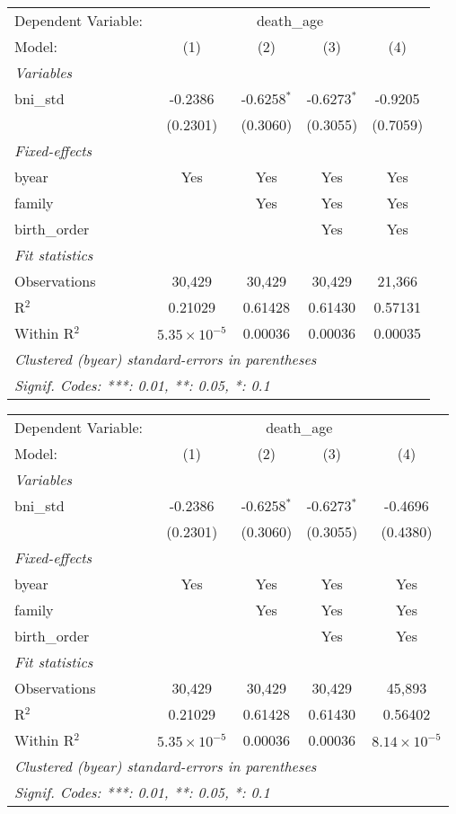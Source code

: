 \begin{tabular}{lcccc}
\tabularnewline\midrule\midrule
Dependent Variable: & \multicolumn{4}{c}{death\_age}\\
Model: & (1) & (2) & (3) & (4)\\
\midrule \emph{Variables} &   &   &   &  \\
bni\_std & -0.2386 & -0.6258$^{*}$ & -0.6273$^{*}$ & -0.9205\\
  & (0.2301) & (0.3060) & (0.3055) & (0.7059)\\
\midrule \emph{Fixed-effects} &   &   &   &  \\
byear & Yes & Yes & Yes & Yes\\
family &  & Yes & Yes & Yes\\
birth\_order &  &  & Yes & Yes\\
\midrule \emph{Fit statistics} &   &   &   &  \\
Observations & 30,429 & 30,429 & 30,429 & 21,366\\
R$^2$ & 0.21029 & 0.61428 & 0.61430 & 0.57131\\
Within R$^2$ & $5.35\times 10^{-5}$ & 0.00036 & 0.00036 & 0.00035\\
\midrule\midrule\multicolumn{5}{l}{\emph{Clustered (byear) standard-errors in parentheses}}\\
\multicolumn{5}{l}{\emph{Signif. Codes: ***: 0.01, **: 0.05, *: 0.1}}\\
\end{tabular}



\begin{tabular}{lcccc}
\tabularnewline\midrule\midrule
Dependent Variable: & \multicolumn{4}{c}{death\_age}\\
Model: & (1) & (2) & (3) & (4)\\
\midrule \emph{Variables} &   &   &   &  \\
bni\_std & -0.2386 & -0.6258$^{*}$ & -0.6273$^{*}$ & -0.4696\\
  & (0.2301) & (0.3060) & (0.3055) & (0.4380)\\
\midrule \emph{Fixed-effects} &   &   &   &  \\
byear & Yes & Yes & Yes & Yes\\
family &  & Yes & Yes & Yes\\
birth\_order &  &  & Yes & Yes\\
\midrule \emph{Fit statistics} &   &   &   &  \\
Observations & 30,429 & 30,429 & 30,429 & 45,893\\
R$^2$ & 0.21029 & 0.61428 & 0.61430 & 0.56402\\
Within R$^2$ & $5.35\times 10^{-5}$ & 0.00036 & 0.00036 & $8.14\times 10^{-5}$\\
\midrule\midrule\multicolumn{5}{l}{\emph{Clustered (byear) standard-errors in parentheses}}\\
\multicolumn{5}{l}{\emph{Signif. Codes: ***: 0.01, **: 0.05, *: 0.1}}\\
\end{tabular}




